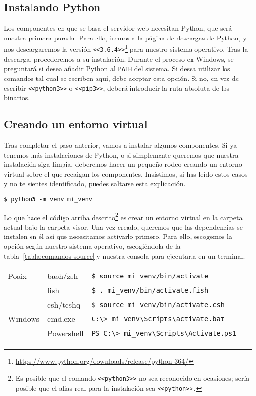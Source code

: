 \subsection{Instalando Python}\label{instalar-python}
Los componentes en que se basa el servidor web necesitan Python, que será nuestra primera parada. Para ello, iremos a la página de descargas de Python, y nos descargaremos la versión \texttt{<<3.6.4>>}\footnote{\url{https://www.python.org/downloads/release/python-364/}} para nuestro sistema operativo. Tras la descarga, procederemos a su instalación. Durante el proceso en Windows, se preguntará si desea añadir Python al \texttt{PATH} del sistema. Si desea utilizar los comandos tal cual se escriben aquí, debe aceptar esta opción. Si no, en vez de escribir \texttt{<<python3>>} o \texttt{<<pip3>>}, deberá introducir la ruta absoluta de los binarios.

\subsection{Creando un entorno virtual}\label{crear-venv}
Tras completar el paso anterior, vamos a instalar algunos componentes. Si ya tenemos más instalaciones de Python, o si simplemente queremos que nuestra instalación siga limpia, deberemos hacer un pequeño rodeo creando un  entorno virtual sobre el que recaigan los componentes. Insistimos, si has leído estos casos y no te sientes identificado, puedes saltarse esta explicación.

\noindent\verb|$ python3 -m venv mi_venv|

Lo que hace el código arriba descrito\footnote{Es posible que el comando \texttt{<<python3>>} no sea reconocido en ocasiones; sería posible que el alias real para la instalación sea \texttt{<<python>>.}} es crear un entorno virtual en la carpeta actual bajo la carpeta visor. Una vez creado, queremos que las dependencias se instalen en él así que necesitamos activarlo primero. Para ello, escogemos la opción según nuestro sistema operativo, escogiéndola de la tabla~\ref{tabla:comandos-source} y nuestra consola para ejecutarla en un terminal.

\begin{tabular}{lll}
	\otoprule
	Posix   & bash/zsh   & \verb|$ source mi_venv/bin/activate|          \\
	\cline{2-3}
	& fish       & \verb|$ . mi_venv/bin/activate.fish|          \\
	\cline{2-3}
	& csh/tcshq  & \verb|$ source mi_venv/bin/activate.csh|      \\
	\midrule
	Windows & cmd.exe    & \verb|C:\> mi_venv\Scripts\activate.bat|    \\
	\cline{2-3}
	& Powershell & \verb|PS C:\> mi_venv\Scripts\Activate.ps1| \\
	\bottomrule
\end{tabular}\label{tabla:comandos-source}

